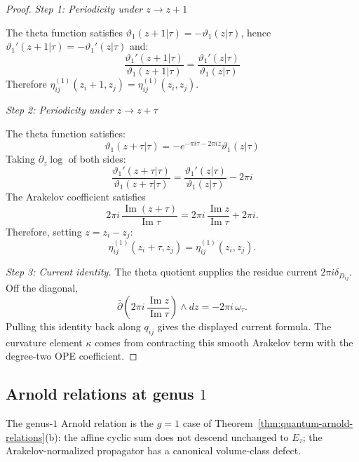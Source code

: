 \begin{proof}

\emph{Step 1: Periodicity under $z \to z + 1$}

The theta function satisfies $\vartheta_1(z + 1|\tau) = -\vartheta_1(z|\tau)$, hence $\vartheta_1'(z+1|\tau) = -\vartheta_1'(z|\tau)$ and:
\begin{equation}
\frac{\vartheta_1'(z+1|\tau)}{\vartheta_1(z+1|\tau)} = \frac{\vartheta_1'(z|\tau)}{\vartheta_1(z|\tau)}
\end{equation}
Therefore $\eta_{ij}^{(1)}(z_i + 1, z_j) = \eta_{ij}^{(1)}(z_i, z_j)$.

\emph{Step 2: Periodicity under $z \to z + \tau$}

The theta function satisfies:
\begin{equation}
\vartheta_1(z + \tau|\tau) = -e^{-\pi i \tau - 2\pi i z} \vartheta_1(z|\tau)
\end{equation}
Taking $\partial_z \log$ of both sides:
\begin{equation}
\frac{\vartheta_1'(z+\tau|\tau)}{\vartheta_1(z+\tau|\tau)} = \frac{\vartheta_1'(z|\tau)}{\vartheta_1(z|\tau)} - 2\pi i
\end{equation}
The Arakelov coefficient satisfies
\[
2\pi i\,\frac{\operatorname{Im}(z+\tau)}{\operatorname{Im}\tau}
=
2\pi i\,\frac{\operatorname{Im}z}{\operatorname{Im}\tau}
+2\pi i .
\]
Therefore, setting $z=z_i-z_j$:
\begin{equation}
\eta_{ij}^{(1)}(z_i + \tau, z_j) = \eta_{ij}^{(1)}(z_i, z_j).
\end{equation}

\emph{Step 3: Current identity.}
The theta quotient supplies the residue current $2\pi i\delta_{D_{ij}}$.
Off the diagonal,
\[
\bar\partial\!\left(
2\pi i\,\frac{\operatorname{Im}z}{\operatorname{Im}\tau}
\right)\wedge dz
=
-2\pi i\,\omega_\tau .
\]
Pulling this identity back along $q_{ij}$ gives the displayed current
formula. The curvature element $\kappa$ comes from contracting this
smooth Arakelov term with the degree-two OPE coefficient.
\end{proof}

\subsection{\texorpdfstring{Arnold relations at genus $1$}{Arnold relations at genus 1}}

The genus-$1$ Arnold relation is the $g=1$ case of
Theorem~\ref{thm:quantum-arnold-relations}(b): the affine cyclic sum
does not descend unchanged to $E_\tau$; the Arakelov-normalized
propagator has a canonical volume-class defect.

